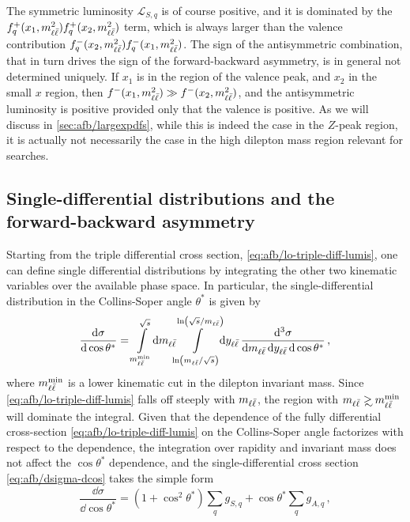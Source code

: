 The symmetric luminosity $\mathcal{L}_{S,q}$ is of course positive, and it is
dominated by the $f_q^+(x_1,m_{\ell\bar{\ell}}^2) f_{q}^+(x_2,m_{\ell\bar{\ell}}^2)$ term, which is always
larger than the valence contribution  $f_q^-(x_2,m_{\ell\bar{\ell}}^2) f_{q}^-(x_1,m_{\ell\bar{\ell}}^2)$.
The sign of the antisymmetric combination, that in turn drives the sign of the
forward-backward asymmetry, is in general not determined uniquely.
%
If $x_1$ is in the region of the valence peak, and $x_2$ in the small $x$
region, then $f^-(x_1,m_{\ell\bar{\ell}}^2)\gg f^-(x_2,m_{\ell\bar{\ell}}^2)$, and the antisymmetric
luminosity is positive provided only that the valence \pdf is positive.
%
As we will discuss in \cref{sec:afb/largexpdfs},
while this is indeed the case in
the $Z$-peak region, it is actually not necessarily the case in the
high dilepton mass region relevant for \bsm searches.

\subsection{Single-differential distributions and the forward-backward asymmetry}
\label{sec:afb/numlo}
Starting from the triple differential cross section,
\cref{eq:afb/lo-triple-diff-lumis}, one can define 
single differential distributions by integrating the other two kinematic variables
over the available phase space.
%
In particular, the single-differential distribution in the
Collins-Soper angle $\theta^*$ is given by
\begin{equation}
  \label{eq:afb/dsigma-dcos}
  \frac{\dd\sigma}{\dd\cos\theta^*} = \int\limits_{m_{\ell\bar{\ell}}^{\text{min}}}^{\sqrt s}\!\dd m_{\ell\bar{\ell}}\!\!\int\limits_{\ln(m_{\ell\bar{\ell}}/\sqrt s)}^{\ln(\sqrt s/m_{\ell\bar{\ell}})}\!\!\dd y_{\ell\bar{\ell}}\, \frac{\dd^3 \sigma}{\dd m_{\ell\bar{\ell}} \, \dd y_{\ell\bar{\ell}} \, \dd\cos\theta^*} \, ,
\end{equation}
where $m_{\ell\bar{\ell}}^{\text{min}}$ is a lower kinematic cut in the dilepton invariant mass.
%
Since \cref{eq:afb/lo-triple-diff-lumis} falls off steeply with $m_{\ell\bar{\ell}}$, the region
with $\mll \gsim \mll^{\text{min}}$ will dominate the integral.
%
Given that the dependence of the fully differential cross-section
\cref{eq:afb/lo-triple-diff-lumis}
on  the Collins-Soper angle factorizes with respect to the \pdf
dependence, the integration over rapidity and invariant mass does not
affect the  $\cos\theta^*$ dependence, and the single-differential
cross section \cref{eq:afb/dsigma-dcos} takes the simple form 
\begin{equation}
  \label{eq:afb/dsigma-dcos-v2}
  \frac{\dd\sigma}{\dd\cos\theta^*} = (1+\cos^2\theta^*)\sum_q g_{S,q} + \cos\theta^*\sum_q g_{A,q} \, ,
\end{equation}
